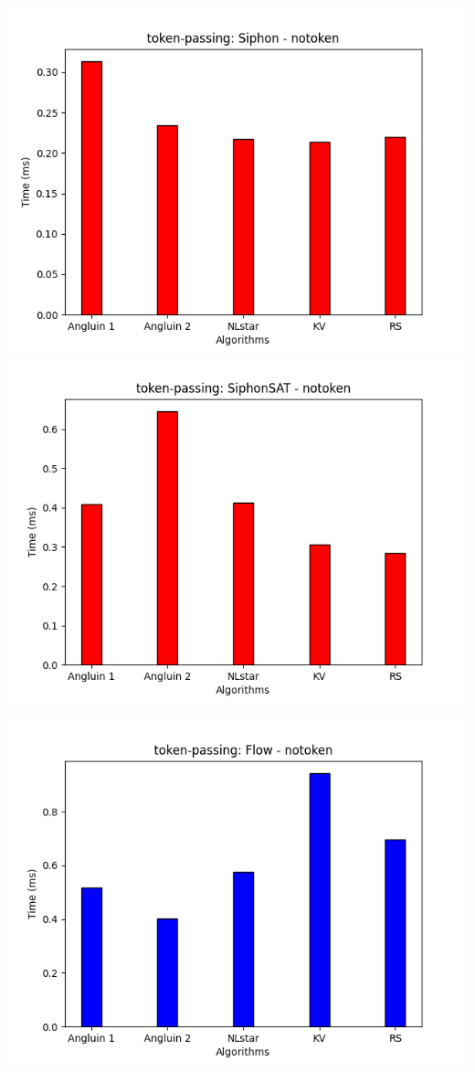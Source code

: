 \includegraphics[scale=0.5]{figures/Siphon_notoken.png}
\includegraphics[scale=0.5]{figures/SiphonSAT_notoken.png}

\includegraphics[scale=0.5]{figures/Flow_notoken.png}


